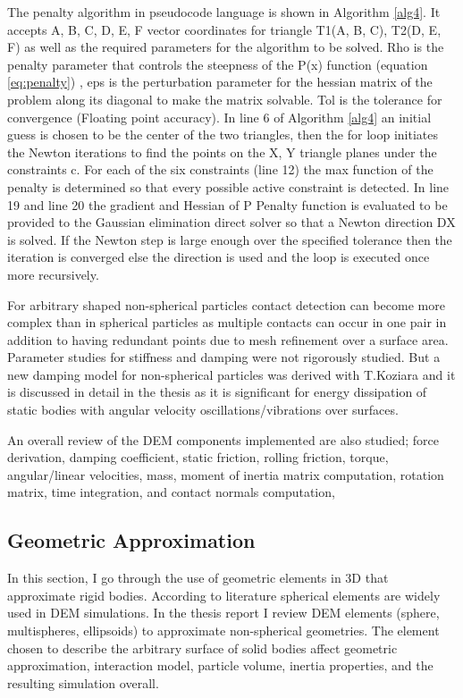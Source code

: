 \documentclass[times,12pt]{article}
\begin{document}
The penalty algorithm in pseudocode language is shown in Algorithm \ref{alg4}. It accepts A, B, C, D, E, F vector coordinates for triangle T1(A, B, C), T2(D, E, F) as well as the required parameters for the algorithm to be solved. Rho is the penalty parameter that controls the steepness of the P(x) function (equation \ref{eq:penalty}) , eps is the perturbation parameter for the hessian matrix of the problem along its diagonal to make the matrix solvable. Tol is the tolerance for convergence (Floating point accuracy). In line 6 of Algorithm \ref{alg4} an initial guess is chosen to be the center of the two triangles, then the for loop initiates the Newton iterations to find the points on the X, Y triangle planes under the constraints c. For each of the six constraints (line 12) the max function of the penalty is determined so that every possible active constraint is detected. In line 19 and line 20 the gradient and Hessian of P Penalty function is evaluated to be provided to the Gaussian elimination direct solver so that a Newton direction DX is solved. If the Newton step is large enough over the specified tolerance then the iteration is converged else the direction is used and the loop is executed once more recursively.


For arbitrary shaped non-spherical particles contact detection can become more complex than in spherical particles as multiple contacts can occur in one pair in addition to having redundant points due to mesh refinement over a surface area. Parameter studies for stiffness and damping were not rigorously studied. But a new damping model for non-spherical particles was derived with T.Koziara \cite{Koziara2010} and it is discussed in detail in the thesis as it is significant for energy dissipation of static bodies with angular velocity oscillations/vibrations over surfaces.   


An overall review of the DEM components implemented are also studied; force derivation, damping coefficient, static friction, rolling friction, torque, angular/linear velocities, mass, moment of inertia matrix computation, rotation matrix, time integration, and contact normals computation,


\subsection{Geometric Approximation}

In this section, I go through the use of geometric elements in 3D that approximate rigid bodies. According to literature \cite{Amberger2012, Boac2014, Fleissner2007, Garcia2009} spherical elements are widely used in DEM simulations. In the thesis report I review DEM elements (sphere, multispheres, ellipsoids) to approximate non-spherical geometries. The element chosen to describe the arbitrary surface of solid bodies affect  geometric approximation, interaction model, particle volume, inertia properties, and the resulting simulation overall.
\end{document}
